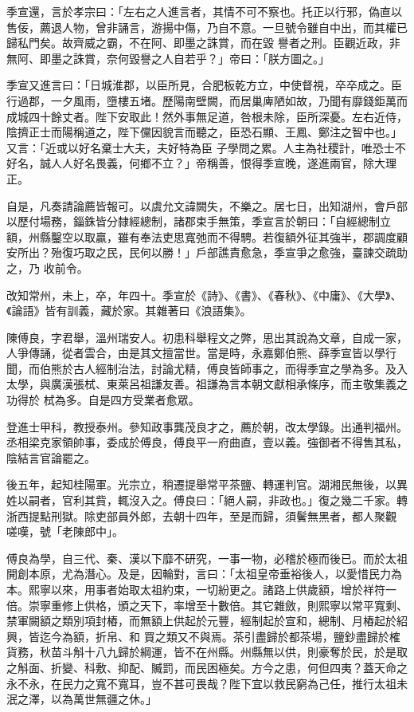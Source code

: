 \begin{pinyinscope}
 季宣還，言於孝宗曰：「左右之人進言者，其情不可不察也。托正以行邪，偽直以售佞，薦退人物，曾非誦言，游揚中傷，乃自不意。一旦號令雖自中出，而其權已歸私門矣。故齊威之霸，不在阿、即墨之誅賞，而在毀
 譽者之刑。臣觀近政，非無阿、即墨之誅賞，奈何毀譽之人自若乎？」帝曰：「朕方圖之。」



 季宣又進言曰：「日城淮郡，以臣所見，合肥板乾方立，中使督視，卒卒成之。臣行過郡，一夕風雨，墮樓五堵。歷陽南壁闕，而居巢庳陋如故，乃聞有靡錢鉅萬而成城四十餘丈者。陛下安取此！然外事無足道，咎根未除，臣所深憂。左右近侍，陰擠正士而陽稱道之，陛下儻因貌言而聽之，臣恐石顯、王鳳、鄭注之智中也。」又言：「近或以好名棄士大夫，夫好特為臣
 子學問之累。人主為社稷計，唯恐士不好名，誠人人好名畏義，何鄉不立？」帝稱善，恨得季宣晚，遂進兩官，除大理正。



 自是，凡奏請論薦皆報可。以虞允文諱闕失，不樂之。居七日，出知湖州，會戶部以歷付場務，錙銖皆分隸經總制，諸郡束手無策，季宣言於朝曰：「自經總制立額，州縣鑿空以取贏，雖有奉法吏思寬弛而不得騁。若復額外征其強半，郡調度顧安所出？殆復巧取之民，民何以勝！」戶部譙責愈急，季宣爭之愈強，臺諫交疏助之，乃
 收前令。



 改知常州，未上，卒，年四十。季宣於《詩》、《書》、《春秋》、《中庸》、《大學》、《論語》皆有訓義，藏於家。其雜著曰《浪語集》。



 陳傅良，字君舉，溫州瑞安人。初患科舉程文之弊，思出其說為文章，自成一家，人爭傳誦，從者雲合，由是其文擅當世。當是時，永嘉鄭伯熊、薛季宣皆以學行聞，而伯熊於古人經制治法，討論尤精，傅良皆師事之，而得季宣之學為多。及入太學，與廣漢張栻、東萊呂祖謙友善。祖謙為言本朝文獻相承條序，而主敬集義之功得於
 栻為多。自是四方受業者愈眾。



 登進士甲科，教授泰州。參知政事龔茂良才之，薦於朝，改太學錄。出通判福州。丞相梁克家領帥事，委成於傅良，傅良平一府曲直，壹以義。強御者不得售其私，陰結言官論罷之。



 後五年，起知桂陽軍。光宗立，稍遷提舉常平茶鹽、轉運判官。湖湘民無後，以異姓以嗣者，官利其貲，輒沒入之。傅良曰：「絕人嗣，非政也。」復之幾二千家。轉浙西提點刑獄。除吏部員外郎，去朝十四年，至是而歸，須鬢無黑者，都人聚觀
 嗟嘆，號「老陳郎中」。



 傅良為學，自三代、秦、漢以下靡不研究，一事一物，必稽於極而後已。而於太祖開創本原，尤為潛心。及是，因輪對，言曰：「太祖皇帝垂裕後人，以愛惜民力為本。熙寧以來，用事者始取太祖約束，一切紛更之。諸路上供歲額，增於祥符一倍。崇寧重修上供格，頒之天下，率增至十數倍。其它雜斂，則熙寧以常平寬剩、禁軍闕額之類別項封樁，而無額上供起於元豐，經制起於宣和，總制、月樁起於紹興，皆迄今為額，折帛、和
 買之類又不與焉。茶引盡歸於都茶場，鹽鈔盡歸於榷貨務，秋苗斗斛十八九歸於綱運，皆不在州縣。州縣無以供，則豪奪於民，於是取之斛面、折變、科敷、抑配、贓罰，而民困極矣。方今之患，何但四夷？蓋天命之永不永，在民力之寬不寬耳，豈不甚可畏哉？陛下宜以救民窮為己任，推行太祖未泯之澤，以為萬世無疆之休。」




\end{pinyinscope}
